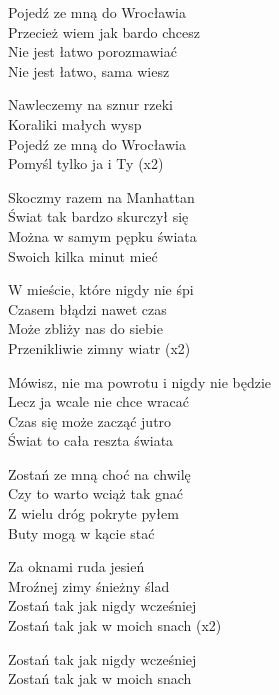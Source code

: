 \begin{text}
    Pojedź ze mną do Wrocławia\\
    Przecież wiem jak bardo chcesz\\
    Nie jest łatwo porozmawiać\\
    Nie jest łatwo, sama wiesz

    \vin Nawleczemy na sznur rzeki\\
    \vin Koraliki małych wysp\\
    \vin Pojedź ze mną do Wrocławia\\
    \vin Pomyśl tylko ja i Ty (x2)

    Skoczmy razem na Manhattan\\
    Świat tak bardzo skurczył się\\
    Można w samym pępku świata\\
    Swoich kilka minut mieć

    \vin W mieście, które nigdy nie śpi\\
    \vin Czasem błądzi nawet czas\\
    \vin Może zbliży nas do siebie\\
    \vin Przenikliwie zimny wiatr (x2)

    Mówisz, nie ma powrotu i nigdy nie będzie\\
    Lecz ja wcale nie chce wracać\\
    Czas się może zacząć jutro\\
    Świat to cała reszta świata

    Zostań ze mną choć na chwilę\\
    Czy to warto wciąż tak gnać\\
    Z wielu dróg pokryte pyłem\\
    Buty mogą w kącie stać

    \vin Za oknami ruda jesień\\
    \vin Mroźnej zimy śnieżny ślad\\
    \vin Zostań tak jak nigdy wcześniej\\
    \vin Zostań tak jak w moich snach (x2)

    Zostań tak jak nigdy wcześniej\\
    Zostań tak jak w moich snach
\end{text}
\begin{chord}

\end{chord}